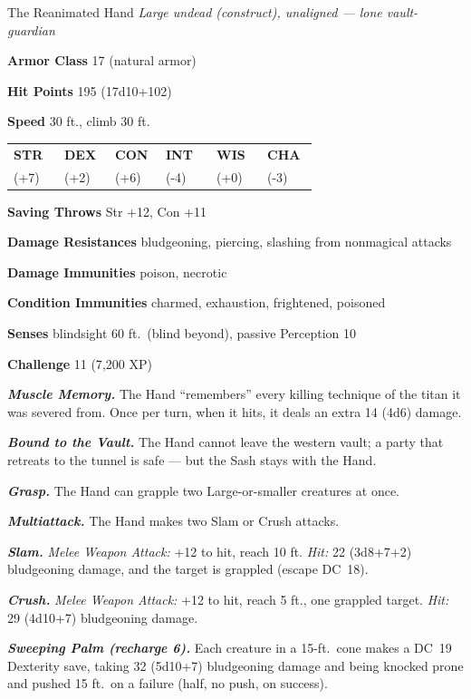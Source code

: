 \documentclass[10pt,twoside]{report}
\makeatletter
\newcommand{\msub}[1]{{\itshape #1}\par}
\newcommand{\mrule}{\par\vspace{2pt}{\color{gukred}\rule{\linewidth}{1.1pt}}\par\vspace{2pt}}
\newcommand{\mthin}{\par\vspace{1pt}{\color{gukred!60}\rule{\linewidth}{0.5pt}}\par\vspace{2pt}}
\newcommand{\mfield}[2]{\noindent\textbf{\color{gukred}#1} #2\par}
\newcommand{\mhead}[1]{\par\smallskip{\sffamily\bfseries\scshape\color{gukred}#1}\par
  \vspace{-3pt}{\color{gukred}\rule{\linewidth}{0.7pt}}\par\vspace{2pt}}
\newcommand{\mtrait}[2]{\noindent\textbf{\itshape #1} #2\par\vspace{2pt}}
\newcommand{\abilities}[6]{\par\smallskip\noindent
  {\setlength{\tabcolsep}{1.5pt}%
  \begin{tabular}{@{}*{6}{p{0.15\linewidth}}@{}}
  \centering\sffamily\bfseries\color{gukred}STR &\centering\sffamily\bfseries\color{gukred}DEX
  &\centering\sffamily\bfseries\color{gukred}CON &\centering\sffamily\bfseries\color{gukred}INT
  &\centering\sffamily\bfseries\color{gukred}WIS &\centering\arraybackslash\sffamily\bfseries\color{gukred}CHA\\
  \centering #1 &\centering #2 &\centering #3 &\centering #4 &\centering #5 &\centering\arraybackslash #6\\
  \end{tabular}}\par\smallskip}
\newcommand{\dc}[1]{DC~#1}
\makeatother
\begin{document}
\begin{statblock}{The Reanimated Hand}
\msub{Large undead (construct), unaligned --- \textnormal{lone vault-guardian}}
\mrule
\mfield{Armor Class}{17 (natural armor)}
\mfield{Hit Points}{195 (17d10+102)}
\mfield{Speed}{30 ft., climb 30 ft.}
\abilities{24 (+7)}{14 (+2)}{22 (+6)}{3 (-4)}{10 (+0)}{5 (-3)}
\mthin
\mfield{Saving Throws}{Str +12, Con +11}
\mfield{Damage Resistances}{bludgeoning, piercing, slashing from nonmagical attacks}
\mfield{Damage Immunities}{poison, necrotic}
\mfield{Condition Immunities}{charmed, exhaustion, frightened, poisoned}
\mfield{Senses}{blindsight 60 ft.\ (blind beyond), passive Perception 10}
\mfield{Challenge}{11 (7{,}200 XP)}
\mrule
\mtrait{Muscle Memory.}{The Hand ``remembers'' every killing technique of the titan it was severed from. Once per turn, when it hits, it deals an extra 14 (4d6) damage.}
\mtrait{Bound to the Vault.}{The Hand cannot leave the western vault; a party that retreats to the tunnel is safe --- but the Sash stays with the Hand.}
\mtrait{Grasp.}{The Hand can grapple two Large-or-smaller creatures at once.}
\mhead{Actions}
\mtrait{Multiattack.}{The Hand makes two Slam or Crush attacks.}
\mtrait{Slam.}{\textit{Melee Weapon Attack:} +12 to hit, reach 10 ft. \textit{Hit:} 22 (3d8+7+2) bludgeoning damage, and the target is grappled (escape \dc{18}).}
\mtrait{Crush.}{\textit{Melee Weapon Attack:} +12 to hit, reach 5 ft., one grappled target. \textit{Hit:} 29 (4d10+7) bludgeoning damage.}
\mtrait{Sweeping Palm (recharge 6).}{Each creature in a 15-ft.\ cone makes a \dc{19} Dexterity save, taking 32 (5d10+7) bludgeoning damage and being knocked prone and pushed 15 ft.\ on a failure (half, no push, on success).}
\end{statblock}
\end{document}
